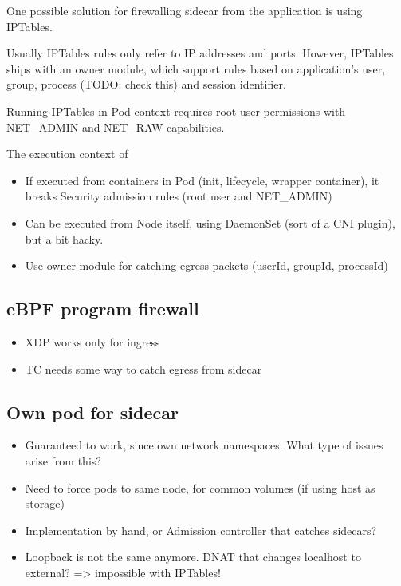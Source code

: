 \documentclass[english, 12pt, a4paper, sci, utf8, a-2b, online]{aaltothesis}
\begin{document}
One possible solution for firewalling sidecar from the application is using IPTables.

Usually IPTables rules only refer to IP addresses and ports. However, IPTables ships with an owner module, which support rules based on application's user, group, process (TODO: check this) and session identifier.

Running IPTables in Pod context requires root user permissions with NET\_ADMIN and NET\_RAW capabilities.

The execution context of

\begin{itemize}
  \item If executed from containers in Pod (init, lifecycle, wrapper container), it breaks Security admission rules (root user and NET\_ADMIN)
  \item Can be executed from Node itself, using DaemonSet (sort of a CNI plugin), but a bit hacky.
  \item Use owner module for catching egress packets (userId, groupId, processId)
\end{itemize}

\subsection{eBPF program firewall}

\begin{itemize}
  \item XDP works only for ingress
  \item TC needs some way to catch egress from sidecar
\end{itemize}

\subsection{Own pod for sidecar}

\begin{itemize}
  \item Guaranteed to work, since own network namespaces. What type of issues arise from this?
  \item Need to force pods to same node, for common volumes (if using host as storage)
  \item Implementation by hand, or Admission controller that catches sidecars?
  \item Loopback is not the same anymore. DNAT that changes localhost to external? => impossible with IPTables!
\end{itemize}
\end{document}
